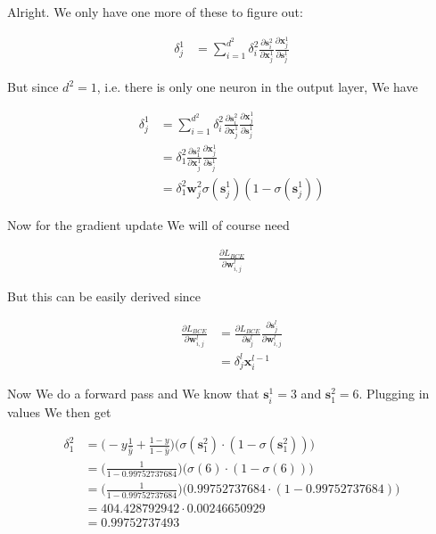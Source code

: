 \documentclass{article}
\begin{document}
	 Alright. We only have one more of these to figure out:
	 
	 \begin{align}
	 	\delta^1_j &= \sum^{d^2}_{i=1}  \delta^2_i \frac{\partial \mathbf{s}^2_i}{\partial \mathbf{x}^{1}_j}\frac{\partial \mathbf{x}^{1}_j}{\partial \mathbf{s}^{1}_j}
	 \end{align}
	 
	 
	 But since $d^2 = 1$, i.e. there is only one neuron in the output layer, We have

	\begin{align}
	 	\delta^1_j &= \sum^{d^2}_{i=1}  \delta^2_i \frac{\partial \mathbf{s}^2_i}{\partial \mathbf{x}^{1}_j}\frac{\partial \mathbf{x}^{1}_j}{\partial \mathbf{s}^{1}_j}\\
	 	&=   \delta^2_1 \frac{\partial \mathbf{s}^2_1}{\partial \mathbf{x}^{1}_j}\frac{\partial \mathbf{x}^{1}_j}{\partial \mathbf{s}^{1}_j}\\
	 	&=   \delta^2_1 \mathbf{w}^2_j \sigma(\mathbf{s}^{1}_j)(1-\sigma(\mathbf{s}^{1}_j))
	 \end{align}
	 
	 Now for the gradient update We will of course need
	 
	 \begin{align}
	 	\frac{\partial L_{BCE}}{\partial \mathbf{w}^l_{i, j}}
	 \end{align}
	 
	 But this can be easily derived since
	 
	 \begin{align}
	 	\frac{\partial L_{BCE}}{\partial \mathbf{w}^l_{i, j}} &= \frac{\partial L_{BCE}}{\partial \mathbf{s}^l_j}\frac{\partial \mathbf{s}^l_j}{\partial \mathbf{w}^l_{i, j}}\\
	 	&= \delta^l_j\mathbf{x}^{l-1}_i
	 \end{align}
	 
	 Now We do a forward pass and We know that $\mathbf{s}^1_i = 3$ and $\mathbf{s}^2_1 = 6$. Plugging in values We then get

	\begin{align}
	 	\delta^2_1 &= \bigg( -y\frac{1}{\hat{y}}  + \frac{1-y}{1-\hat{y}} \bigg) \bigg( \sigma(\mathbf{s}^2_1)\cdot(1-\sigma(\mathbf{s}^2_1)) \bigg)\\
	 	&= \bigg( \frac{1}{1-0.99752737684} \bigg) \bigg( \sigma(6)\cdot(1-\sigma(6)) \bigg)\\
	 	&= \bigg( \frac{1}{1-0.99752737684} \bigg) \bigg( 0.99752737684\cdot(1-0.99752737684) \bigg)\\
	 	&= 404.428792942\cdot 0.00246650929\\
	 	&= 0.99752737493
	 \end{align}
	 
\end{document}
